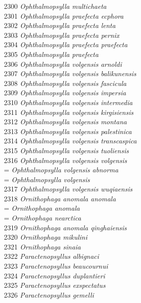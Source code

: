 \documentclass[
]{article}
\begin{document}
2300 \emph{Ophthalmopsylla multichaeta}\\
2301 \emph{Ophthalmopsylla praefecta ecphora}\\
2302 \emph{Ophthalmopsylla praefecta lenta}\\
2303 \emph{Ophthalmopsylla praefecta pernix}\\
2304 \emph{Ophthalmopsylla praefecta praefecta}\\
2305 \emph{Ophthalmopsylla praefecta}\\
2306 \emph{Ophthalmopsylla volgensis arnoldi}\\
2307 \emph{Ophthalmopsylla volgensis balikunensis}\\
2308 \emph{Ophthalmopsylla volgensis fascicula}\\
2309 \emph{Ophthalmopsylla volgensis impersia}\\
2310 \emph{Ophthalmopsylla volgensis intermedia}\\
2311 \emph{Ophthalmopsylla volgensis kirgisiensis}\\
2312 \emph{Ophthalmopsylla volgensis montana}\\
2313 \emph{Ophthalmopsylla volgensis palestinica}\\
2314 \emph{Ophthalmopsylla volgensis transcaspica}\\
2315 \emph{Ophthalmopsylla volgensis tuoliensis}\\
2316 \emph{Ophthalmopsylla volgensis volgensis}\\
= \emph{Ophthalmopsylla volgensis abnorma}\\
= \emph{Ophthalmopsylla volgensis}\\
2317 \emph{Ophthalmopsylla volgensis wuqiaensis}\\
2318 \emph{Ornithophaga anomala anomala}\\
= \emph{Ornithophaga anomala}\\
= \emph{Ornithophaga nearctica}\\
2319 \emph{Ornithophaga anomala qinghaiensis}\\
2320 \emph{Ornithophaga mikulini}\\
2321 \emph{Ornithophaga sinaia}\\
2322 \emph{Paractenopsyllus albignaci}\\
2323 \emph{Paractenopsyllus beaucournui}\\
2324 \emph{Paractenopsyllus duplantieri}\\
2325 \emph{Paractenopsyllus exspectatus}\\
2326 \emph{Paractenopsyllus gemelli}\\
\end{document}
